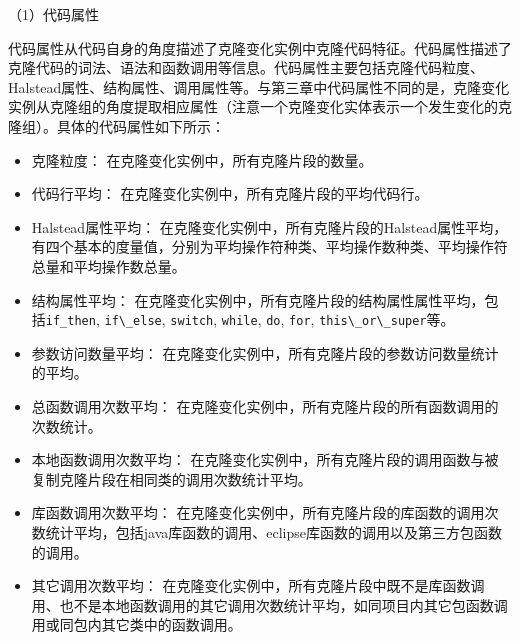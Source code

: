 

（1）代码属性

代码属性从代码自身的角度描述了克隆变化实例中克隆代码特征。代码属性描述了克隆代码的词法、语法和函数调用等信息。代码属性主要包括克隆代码粒度、Halstead属性、结构属性、调用属性等。与第三章中代码属性不同的是，克隆变化实例从克隆组的角度提取相应属性（注意一个克隆变化实体表示一个发生变化的克隆组）。具体的代码属性如下所示：
\begin{itemize}
\item 
克隆粒度：
在克隆变化实例中，所有克隆片段的数量。
\item 
代码行平均：
在克隆变化实例中，所有克隆片段的平均代码行。
\item 
Halstead属性平均：
在克隆变化实例中，所有克隆片段的Halstead属性平均，有四个基本的度量值，分别为平均操作符种类、平均操作数种类、平均操作符总量和平均操作数总量。
\item
结构属性平均：
在克隆变化实例中，所有克隆片段的结构属性属性平均，包括\verb+if_then+, \verb+if\_else+, \verb+switch+, \verb+while+, \verb+do+, \verb+for+,  \verb+this\_or\_super+等。 
\item 
参数访问数量平均：
在克隆变化实例中，所有克隆片段的参数访问数量统计的平均。
\item  
总函数调用次数平均：
在克隆变化实例中，所有克隆片段的所有函数调用的次数统计。
\item  
本地函数调用次数平均：
在克隆变化实例中，所有克隆片段的调用函数与被复制克隆片段在相同类的调用次数统计平均。
\item  
库函数调用次数平均：
在克隆变化实例中，所有克隆片段的库函数的调用次数统计平均，包括java库函数的调用、eclipse库函数的调用以及第三方包函数的调用。
\item  
其它调用次数平均：
在克隆变化实例中，所有克隆片段中既不是库函数调用、也不是本地函数调用的其它调用次数统计平均，如同项目内其它包函数调用或同包内其它类中的函数调用。
\end{itemize}


